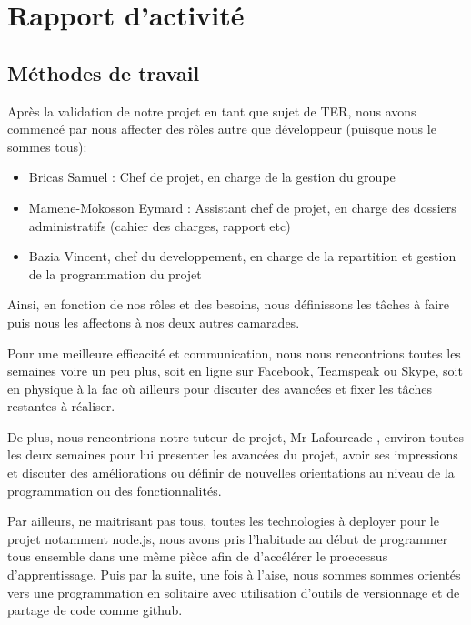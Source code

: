 \chapter{Rapport d'activité}



\section{Méthodes de travail}

Après la validation de notre projet en tant que sujet de TER, nous avons commencé par nous affecter des rôles autre que développeur (puisque nous le sommes tous):
\begin{itemize}
        \item Bricas Samuel : Chef de projet, en charge de la gestion du groupe
        \item Mamene-Mokosson Eymard : Assistant chef de projet, en charge des dossiers administratifs (cahier des charges, rapport etc)
		 
        \item Bazia Vincent, chef du developpement, en charge de la repartition et gestion de la programmation du projet
        
\end{itemize}

Ainsi, en fonction de nos rôles et des besoins, nous définissons les tâches à faire puis nous les affectons à nos deux autres camarades.

Pour une meilleure efficacité et communication, nous nous rencontrions toutes les semaines voire un peu plus, soit en ligne sur Facebook, Teamspeak ou Skype, soit en physique à la fac où ailleurs pour discuter des avancées et fixer les tâches restantes à réaliser.

De plus, nous rencontrions notre tuteur de projet, Mr Lafourcade , environ toutes les deux semaines pour lui presenter les avancées du projet, avoir ses impressions et discuter des améliorations ou définir de nouvelles orientations au niveau de la programmation ou des fonctionnalités.\vspace{.07in}

Par ailleurs, ne maitrisant pas tous, toutes les technologies à deployer pour le projet notamment node.js, nous avons pris l'habitude au début de programmer tous ensemble dans une même pièce afin de d'accélérer le proecessus d'apprentissage. Puis par la suite, une fois à l'aise, nous sommes sommes orientés vers une programmation en solitaire avec utilisation d'outils de versionnage et de partage de code comme github. 


